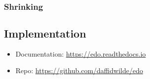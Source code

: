 
\subsubsection{Shrinking}


\subsection{Implementation}\label{subsection:implementation}

\begin{itemize}
    \item Documentation: \url{https://edo.readthedocs.io}
    \item Repo: \url{https://github.com/daffidwilde/edo}
\end{itemize}

